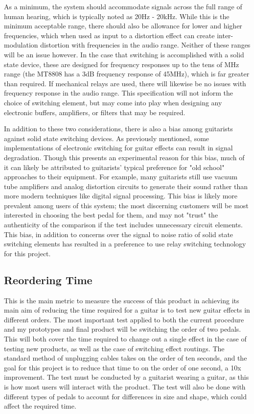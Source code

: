 \documentclass{article}
\begin{document}
	As a minimum, the system should accommodate signals across the full range of human hearing, which is typically noted as 20Hz - 20kHz.  While this is the minimum acceptable range, there should also be allowance for lower and higher frequencies, which when used as input to a distortion effect can create inter-modulation distortion with frequencies in the audio range.  Neither of these ranges will be an issue however.  In the case that switching is accomplished with a solid state device, these are designed for frequency responses up to the tens of MHz range (the MT8808 has a 3dB frequency response of 45MHz), which is far greater than required.  If mechanical relays are used, there will likewise be no issues with frequency response in the audio range.  This specification will not inform the choice of switching element, but may come into play when designing any electronic buffers, amplifiers, or filters that may be required.

	In addition to these two considerations, there is also a bias among guitarists against solid state switching devices.  As previously mentioned, some implementations of electronic switching for guitar effects can result in signal degradation.  Though this presents an experimental reason for this bias, much of it can likely be attributed to guitarists' typical preference for "old school" approaches to their equipment.  For example, many guitarists still use vacuum tube amplifiers and analog distortion circuits to generate their sound rather than more modern techniques like digital signal processing.  This bias is likely more prevalent among users of this system; the most discerning customers will be most interested in choosing the best pedal for them, and may not "trust" the authenticity of the comparison if the test includes unnecessary circuit elements.  This bias, in addition to concerns over the signal to noise ratio of solid state switching elements has resulted in a preference to use relay switching technology for this project.

	\subsection{Reordering Time}
	This is the main metric to measure the success of this product in achieving its main aim of reducing the time required for a guitar is to test new guitar effects in different orders.  The most important test applied to both the current procedure and my prototypes and final product will be switching the order of two pedals.  This will both cover the time required to change out a single effect in the case of testing new products, as well as the case of switching effect routings.  The standard method of unplugging cables takes on the order of ten seconds, and the goal for this project is to reduce that time to on the order of one second, a 10x improvement.  The test must be conducted by a guitarist wearing a guitar, as this is how most users will interact with the product.  The test will also be done with different types of pedals to account for differences in size and shape, which could affect the required time.
\end{document}
